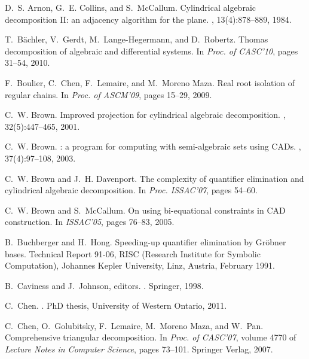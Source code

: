 \documentclass[10pt]{article}
\begin{document}

\begin{thebibliography}{10}

D.~S. Arnon, G.~E. Collins, and S.~McCallum.
\newblock Cylindrical algebraic decomposition {II}: an adjacency algorithm for
  the plane.
, 13(4):878--889, 1984.

T.~B\"{a}chler, V.~Gerdt, M.~Lange-Hegermann, and D.~Robertz.
\newblock Thomas decomposition of algebraic and differential systems.
\newblock In {\em Proc. of CASC'10}, pages 31--54, 2010.

F.~Boulier, C.~Chen, F.~Lemaire, and M.~{Moreno Maza}.
\newblock Real root isolation of regular chains.
\newblock In {\em Proc. of {ASCM'09}}, pages 15--29, 2009.

C.~W. Brown.
\newblock Improved projection for cylindrical algebraic decomposition.
, 32(5):447--465, 2001.

C.~W. Brown.
: a program for computing with semi-algebraic sets
  using {CAD}s.
, 37(4):97--108, 2003.

C.~W. Brown and J.~H. Davenport.
\newblock The complexity of quantifier elimination and cylindrical algebraic
  decomposition.
\newblock In {\em Proc. ISSAC'07}, pages 54--60.

C.~W. Brown and S.~McCallum.
\newblock On using bi-equational constraints in {CAD} construction.
\newblock In {\em ISSAC'05}, pages 76--83, 2005.

B.~Buchberger and H.~Hong.
\newblock Speeding-up quantifier elimination by {Gr\"{o}bner} bases.
\newblock Technical Report 91-06, {RISC} (Research Institute for Symbolic
  Computation), Johannes Kepler University, Linz, Austria, February 1991.

B.~Caviness and J.~Johnson, editors.
.
\newblock Springer, 1998.

C.~Chen.
.
\newblock PhD thesis, University of Western Ontario, 2011.

C.~Chen, O.~Golubitsky, F.~Lemaire, M.~{{Moreno Maza}}, and W.~Pan.
\newblock Comprehensive triangular decomposition.
\newblock In {\em {Proc. of CASC'07}}, volume 4770 of {\em Lecture Notes in
  Computer Science}, pages 73--101. Springer Verlag, 2007.


\end{thebibliography}
\end{document}
